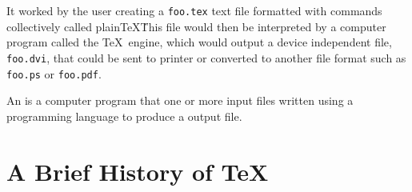 It worked by the user creating a \texttt{foo.tex} 
text file formatted with commands collectively called plain\TeX\. This file would 
then be interpreted by a computer program called the \TeX\ engine, which would 
output a device independent file, \texttt{foo.dvi}, that could be sent to printer or 
converted to another file format such as \texttt{foo.ps} or \texttt{foo.pdf}.
\begin{definition}[Engine]
\label{defn:engine}
An  is a computer program that  one or more input 
files written using a programming language to produce a output file.
\end{definition}

\section{A Brief History of \TeX}

